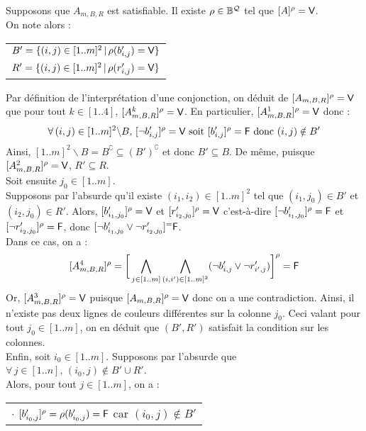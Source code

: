 			\begin{Preuve}
				\impright Supposons que \(A_{m,B,R}\) est satisfiable. Il existe \(\rho\in\mathbb{B}^{\mathcal{Q}}\) tel que \([A]^{\rho} = \text{\sf{V}}\). \\
				On note alors : \!\begin{tabular}[t]{l}
					\bdot \(B' = \{(i,j)\in [1..m]^2\,|\,\rho(b'_{i,j}) = \text{\sf{V}}\}\) \\
					\bdot \(R' = \{(i,j)\in [1..m]^2\,|\,\rho(r'_{i,j}) = \text{\sf{V}}\}\)
				\end{tabular} \nt
				Par définition de l'interprétation d'une conjonction, on déduit de \([A_{m,B,R}]^{\rho} = \text{\sf{V}}\) que pour tout \(k\in[1..4]\), \([A^k_{m,B,R}]^{\rho} = \text{\sf{V}}\). \nt
				\bdot En particulier, \([A^{1}_{m,B,R}]^{\rho} = \text{\sf{V}}\) donc :
					\[\forall\,(i,j)\in[1..m]^2\backslash B,\,[\neg b'_{i,j}]^{\rho} = \text{\sf{V}} \text{ soit } [b'_{i,j}]^{\rho} = \text{\sf{F}} \text{ donc } (i,j)\notin B'\]
				Ainsi, \([1..m]^2\backslash B = B^\complement \subseteq (B')^\complement\) et donc \(B' \subseteq B\). De même, puisque \([A^{2}_{m,B,R}]^{\rho} = \text{\sf{V}}\), \(R' \subseteq R\). \\[3mm]
				\bdot Soit ensuite \(j_0\in [1..m]\). \eqskip{2mm}\\
				Supposons par l'absurde qu'il existe \((i_1,i_2)\in[1..m]^2\) tel que \((i_1,j_0)\in B'\) et \((i_2,j_0)\in R'\). Alors, \([b'_{i_1,j_0}]^{\rho} = \text{\sf{V}}\) et \([r'_{i_2,j_0}]^{\rho} = \text{\sf{V}}\) c'est-à-dire \([\neg b'_{i_1,j_0}]^{\rho} = \text{\sf{F}}\) et \([\neg r'_{i_2,j_0}]^{\rho} = \text{\sf{F}}\), donc \([\neg b'_{i_1,j_0} \vee \neg r'_{i_2,j_0}]^{=} \text{\sf{F}}\).\\
				Dans ce cas, on a :
					\[
						[A^{4}_{m,B,R}]^{\rho} = \bigg[\bigwedge_{j\in[1..m]} \bigwedge_{(i,i')\in[1..m]^2} (\neg b'_{i,j} \vee \neg r'_{i',j})\bigg]^\rho = \text{\sf{F}}
					\]
				Or, \([A^{3}_{m,B,R}]^{\rho} = \text{\sf{V}}\) puisque \([A_{m,B,R}]^{\rho} = \text{\sf{V}}\) donc on a une contradiction. \nt
				Ainsi, il n'existe pas deux lignes de couleurs différentes sur la colonne \(j_0\). Ceci valant pour tout \(j_0\in[1..m]\), on en déduit que \((B',R')\) satisfait la condition sur les colonnes. \\[3mm]
				\bdot Enfin, soit \(i_0 \in[1..m]\). Supposons par l'absurde que \(\forall\,j\in[1..n],\,(i_0,j)\notin B'\cup R'\). \\
				Alors, pour tout \(j\in[1..m]\), on a : \begin{tabular}[t]{l}
					\(\cdot\) \([b'_{i_0,j}]^{\rho} = \rho(b'_{i_0,j}) = \text{\sf{F}} \) car \((i_0,j) \notin B'\) \\

\end{tabular}
\end{Preuve}
